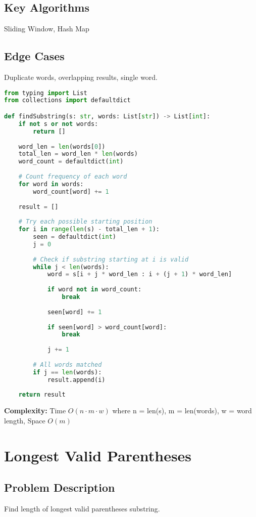 \documentclass[10pt, a4paper]{article}
\begin{document}
\subsection*{Key Algorithms}
Sliding Window, Hash Map

\subsection*{Edge Cases}
Duplicate words, overlapping results, single word.

\begin{lstlisting}[language=Python]
from typing import List
from collections import defaultdict

def findSubstring(s: str, words: List[str]) -> List[int]:
    if not s or not words:
        return []
    
    word_len = len(words[0])
    total_len = word_len * len(words)
    word_count = defaultdict(int)
    
    # Count frequency of each word
    for word in words:
        word_count[word] += 1
    
    result = []
    
    # Try each possible starting position
    for i in range(len(s) - total_len + 1):
        seen = defaultdict(int)
        j = 0
        
        # Check if substring starting at i is valid
        while j < len(words):
            word = s[i + j * word_len : i + (j + 1) * word_len]
            
            if word not in word_count:
                break
                
            seen[word] += 1
            
            if seen[word] > word_count[word]:
                break
                
            j += 1
        
        # All words matched
        if j == len(words):
            result.append(i)
    
    return result
\end{lstlisting}
\textbf{Complexity:} Time $O(n \cdot m \cdot w)$ where n = len(s), m = len(words), w = word length, Space $O(m)$

\section{Longest Valid Parentheses}
\subsection*{Problem Description}
Find length of longest valid parentheses substring.
\end{document}
